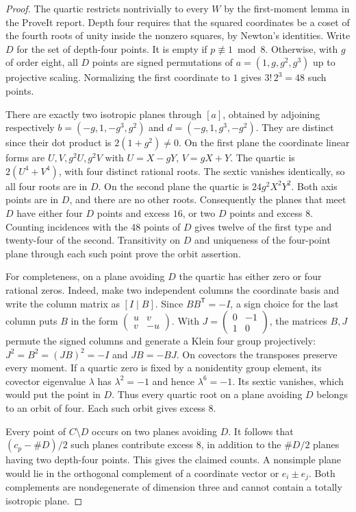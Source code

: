 \documentclass[11pt]{article}
\begin{document}
\begin{proof}
The quartic restricts nontrivially to every $W$ by the first-moment
lemma in the ProveIt report. Depth four requires that the squared
coordinates be a coset of the fourth roots of unity inside the
nonzero squares, by Newton's identities. Write $D$ for the set
of depth-four points. It is empty if $p\not\equiv1\bmod8$.
Otherwise, with $g$ of order eight, all $D$ points are signed
permutations of $a=(1,g,g^2,g^3)$ up to projective scaling.
Normalizing the first coordinate to $1$ gives
$3!\,2^3=48$ such points.

There are exactly two isotropic planes through $[a]$, obtained
by adjoining respectively $b=(-g,1,-g^3,g^2)$ and
$d=(-g,1,g^3,-g^2)$. They are distinct since their dot product is
$2(1+g^2)\ne0$. On the first plane the coordinate linear forms
are $U,V,g^2U,g^2V$ with $U=X-gY$, $V=gX+Y$. The quartic is
$2(U^4+V^4)$, with four distinct rational roots. The sextic
vanishes identically, so all four roots are in $D$.
On the second plane the quartic is $24g^2X^2Y^2$.
Both axis points are in $D$, and there are no other roots.
Consequently the planes that meet $D$ have either four $D$ points
and excess $16$, or two $D$ points and excess $8$.
Counting incidences with the 48 points of $D$ gives twelve of
the first type and twenty-four of the second. Transitivity on
$D$ and uniqueness of the four-point plane through each such
point prove the orbit assertion.

For completeness, on a plane avoiding $D$ the quartic has
either zero or four rational zeros. Indeed, make two independent
columns the coordinate basis and write the column matrix as
$[I\mid B]$. Since $BB^{\mathsf T}=-I$, a sign choice for the last
column puts $B$ in the form
$\left(\begin{smallmatrix}u&v\\v&-u\end{smallmatrix}\right)$.
With $J=\left(\begin{smallmatrix}0&-1\\1&0\end{smallmatrix}\right)$,
the matrices $B,J$ permute the signed columns and generate a
Klein four group projectively: $J^2=B^2=(JB)^2=-I$ and $JB=-BJ$.
On covectors the transposes preserve every moment. If a quartic
zero is fixed by a nonidentity group element, its covector
eigenvalue $\lambda$ has $\lambda^2=-1$ and hence
$\lambda^6=-1$. Its sextic vanishes, which would put the point
in $D$. Thus every quartic root on a plane avoiding $D$ belongs
to an orbit of four. Each such orbit gives excess $8$.

Every point of $C\setminus D$ occurs on two planes avoiding $D$.
It follows that $(c_p-\#D)/2$ such planes contribute excess $8$,
in addition to the $\#D/2$ planes having two depth-four points.
This gives the claimed counts. A nonsimple plane would lie in
the orthogonal complement of a coordinate vector or
$e_i\pm e_j$. Both complements are nondegenerate of dimension
three and cannot contain a totally isotropic plane.
\end{proof}
\end{document}
